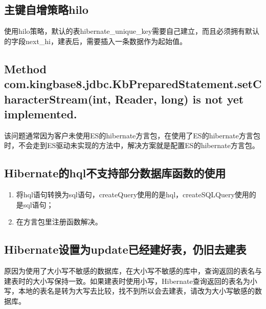 \documentclass[letterpaper,10pt,english]{sphinxmanual}
\begin{document}
\subsection{主键自增策略hilo}
\label{\detokenize{interface/hibernate:hilo}}
使用hilo策略，默认的表hibernate\_unique\_key需要自己建立，而且必须拥有默认的字段next\_hi，建表后，需要插入一条数据作为起始值。

\begin{sphinxVerbatim}[commandchars=\\\{\}]
      
    
\end{sphinxVerbatim}


\subsection{Method com.kingbase8.jdbc.KbPreparedStatement.setCharacterStream(int, Reader, long) is not yet implemented.}
\label{\detokenize{interface/hibernate:method-com-kingbase8-jdbc-kbpreparedstatement-setcharacterstream-int-reader-long-is-not-yet-implemented}}
该问题通常因为客户未使用ES的hibernate方言包，在使用了ES的hibernate方言包时，不会走到ES驱动未实现的方法中，解决方案就是配置ES的hibernate方言包。


\subsection{Hibernate的hql不支持部分数据库函数的使用}
\label{\detokenize{interface/hibernate:hibernatehql}}\begin{enumerate}
%
\item {} 
将hql语句转换为sql语句，createQuery使用的是hql，createSQLQuery使用的是sql语句；

\item {} 
在方言包里注册函数解决。

\end{enumerate}


\subsection{Hibernate设置为update已经建好表，仍旧去建表}
\label{\detokenize{interface/hibernate:hibernateupdate}}
原因为使用了大小写不敏感的数据库，在大小写不敏感的库中，查询返回的表名与建表时的大小写保持一致。如果建表时使用小写，Hibernate查询返回的表名为小写，本地的表名是转为大写去比较，找不到所以会去建表，请改为大小写敏感的数据库。
\end{document}
